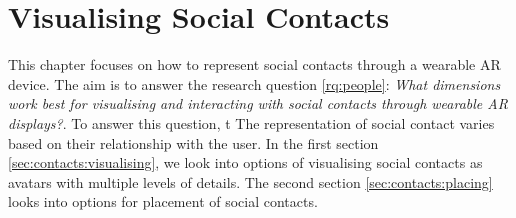 \chapter{Visualising Social Contacts}
\label{ch:contacts} 

This chapter focuses on how to represent social contacts through a wearable AR device. The aim is to answer the research question \ref{rq:people}: \textit{What dimensions work best for visualising and interacting with social contacts through wearable AR displays?}. To answer this question, t
The representation of social contact varies based on their relationship with the user. 
In the first section \ref{sec:contacts:visualising}, we look into options of visualising social contacts as avatars with multiple levels of details. The second section \ref{sec:contacts:placing} looks into options for placement of social contacts. 




